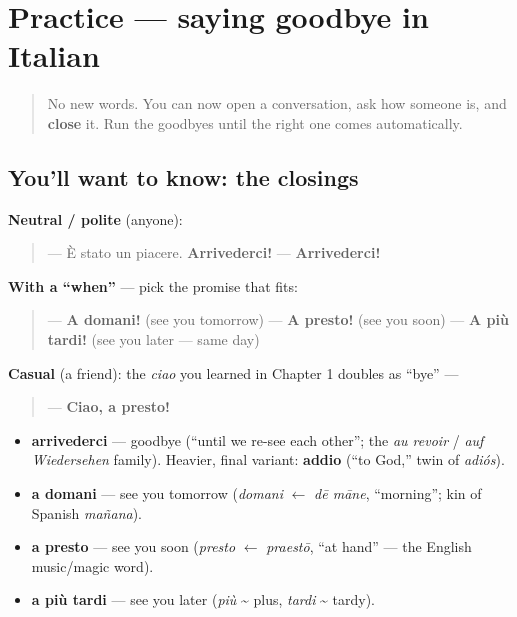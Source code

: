 \section[Practice]{Practice — saying goodbye in Italian}

\label{lesson:IT-C04-practice}



\begin{quote}
No new words. You can now open a conversation, ask how someone is, and \textbf{close} it. Run the goodbyes until the right one comes automatically.
\end{quote}

\subsection*{You'll want to know: the closings}
\textbf{Neutral / polite} (anyone):

\begin{quote}
— È stato un piacere. \textbf{Arrivederci!} — \textbf{Arrivederci!}
\end{quote}

\textbf{With a \textquotedblleft{}when\textquotedblright{}} — pick the promise that fits:

\begin{quote}
— \textbf{A domani!} (see you tomorrow) — \textbf{A presto!} (see you soon) — \textbf{A più tardi!} (see you later — same day)
\end{quote}

\textbf{Casual} (a friend): the \emph{ciao} you learned in Chapter 1 doubles as \textquotedblleft{}bye\textquotedblright{} —

\begin{quote}
— \textbf{Ciao, a presto!}
\end{quote}

\begin{grammarlens}[title={What you've built this chapter}]
\begin{itemize}
\raggedright
  \item \textbf{arrivederci} — goodbye (\textquotedblleft{}until we re-see each other\textquotedblright{}; the \emph{au revoir} / \emph{auf Wiedersehen} family). Heavier, final variant: \textbf{addio} (\textquotedblleft{}to God,\textquotedblright{} twin of \emph{adiós}).
  \item \textbf{a domani} — see you tomorrow (\emph{domani} $\leftarrow$ \emph{dē māne}, \textquotedblleft{}morning\textquotedblright{}; kin of Spanish \emph{mañana}).
  \item \textbf{a presto} — see you soon (\emph{presto} $\leftarrow$ \emph{praestō}, \textquotedblleft{}at hand\textquotedblright{} — the English music/magic word).
  \item \textbf{a più tardi} — see you later (\emph{più} \textasciitilde{} plus, \emph{tardi} \textasciitilde{} tardy).
\end{itemize}
\end{grammarlens}

